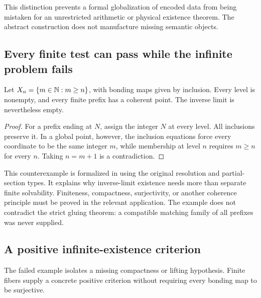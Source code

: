 This distinction prevents a formal globalization of encoded data from being mistaken for an unrestricted arithmetic or physical existence theorem. The abstract construction does not manufacture missing semantic objects.

\subsection{Every finite test can pass while the infinite problem fails}
\begin{example}\label{KS54}
Let \(X_n=\{m\in\mathbb N:m\ge n\}\), with bonding maps given by inclusion. Every level is nonempty, and every finite prefix has a coherent point. The inverse limit is nevertheless empty.
\end{example}
\begin{proof}
For a prefix ending at \(N\), assign the integer \(N\) at every level. All inclusions preserve it. In a global point, however, the inclusion equations force every coordinate to be the same integer \(m\), while membership at level \(n\) requires \(m\ge n\) for every \(n\). Taking \(n=m+1\) is a contradiction.
\end{proof}
This counterexample is formalized in  using the original resolution and partial-section types. It explains why inverse-limit existence needs more than separate finite solvability. Finiteness, compactness, surjectivity, or another coherence principle must be proved in the relevant application. The example does not contradict the strict gluing theorem: a compatible matching family of all prefixes was never supplied.

\subsection{A positive infinite-existence criterion}
The failed example isolates a missing compactness or lifting hypothesis. Finite fibers supply a concrete positive criterion without requiring every bonding map to be surjective.

